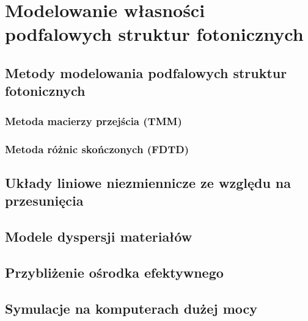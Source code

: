 \chapter{Modelowanie własności podfalowych struktur fotonicznych}
\section{Metody modelowania podfalowych struktur fotonicznych}

\subsection{Metoda macierzy przejścia (TMM)}

\subsection{Metoda różnic skończonych (FDTD)}

\section{Układy liniowe niezmiennicze ze względu na przesunięcia}

\section{Modele dyspersji materiałów}

\section{Przybliżenie ośrodka efektywnego}

\section{Symulacje na komputerach dużej mocy}

